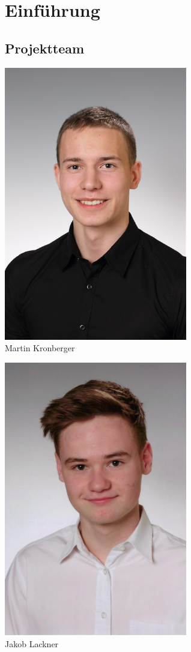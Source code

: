  \chapter{Einführung}
\section{Projektteam}

\centering
\medskip
\begin{minipage}{0.45\textwidth}
	\centering
	\includegraphics[width=0.6\textwidth]{figures/allgemein/portrait_Kronberger.jpg} 
	\medskip	
	\\Martin Kronberger
\end{minipage}\hfill
\begin{minipage}{0.45\textwidth}
	\centering
	\includegraphics[width=0.6\textwidth]{figures/allgemein/portrait_Lackner.jpg} 
	\medskip
	\\Jakob Lackner
\end{minipage}
\vspace{1cm}

